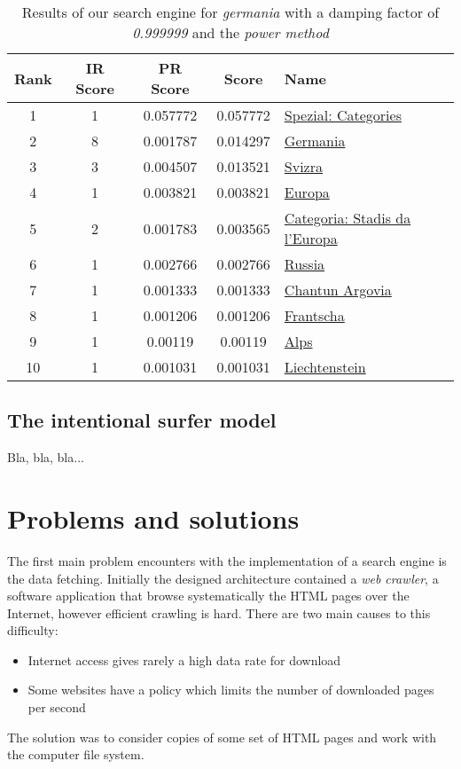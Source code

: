 \documentclass[pdftex,12pt,a4paper]{article}
\begin{document}
\begin{table}[H]
\centering
\begin{tabular}{ | c | c | c | c | l | }
\hline
Rank & IR Score & PR Score &  Score & Name \\ \hline
1 & 1 & 0.057772 & 0.057772 & \href{http://rm.wikipedia.org/wiki/Spezial:Categories}{Spezial: Categories} \\ \hline
2 & 8 & 0.001787 & 0.014297 & \href{http://rm.wikipedia.org/wiki/Germania}{Germania} \\ \hline
3 & 3 & 0.004507 & 0.013521 & \href{http://rm.wikipedia.org/wiki/Svizra}{Svizra} \\ \hline
4 & 1 & 0.003821 & 0.003821 & \href{http://rm.wikipedia.org/wiki/Europa}{Europa} \\ \hline
5 & 2 & 0.001783 & 0.003565 & \href{http://rm.wikipedia.org/wiki/Categoria:Stadis_da_l'Europa_dfba}{Categoria: Stadis da l'Europa} \\ \hline
6 & 1 & 0.002766 & 0.002766 & \href{http://rm.wikipedia.org/wiki/Russia}{Russia} \\ \hline
7 & 1 & 0.001333 & 0.001333 & \href{http://rm.wikipedia.org/wiki/Chantun_Argovia}{Chantun Argovia} \\ \hline
8 & 1 & 0.001206 & 0.001206 & \href{http://rm.wikipedia.org/wiki/Frantscha}{Frantscha} \\ \hline
9 & 1 & 0.00119 & 0.00119 & \href{http://rm.wikipedia.org/wiki/Alps}{Alps} \\ \hline
10 & 1 & 0.001031 & 0.001031 & \href{http://rm.wikipedia.org/wiki/Liechtenstein}{Liechtenstein} \\ \hline
\end{tabular}
\caption{Results of our search engine for \emph{germania} with a damping factor of \emph{0.999999} and the \emph{power method}}
\label{table_d=0.999999}
\end{table}


\subsection{The intentional surfer model}
Bla, bla, bla...


\section{Problems and solutions}

The first main problem encounters with the implementation of a search engine is the data fetching. Initially the designed architecture contained a \emph{web crawler}, a software application that browse systematically the HTML pages over the Internet, however efficient crawling is hard.
There are two main causes to this difficulty:
\begin{itemize}
\item Internet access gives rarely a high data rate for download
\item Some websites have a policy which limits the number of downloaded pages per second
\end{itemize}
The solution was to consider copies of some set of HTML pages and work with the computer file system.
\end{document}
